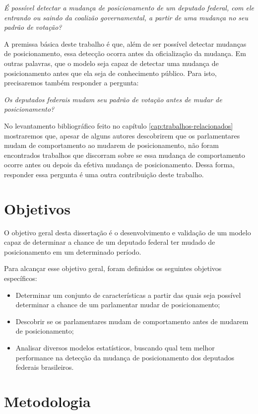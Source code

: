 \emph{É possível detectar a mudança de posicionamento de um deputado federal,
com ele entrando ou saindo da coalizão governamental, a partir de uma mudança
no seu padrão de votação?}

A premissa básica deste trabalho é que, além de ser possível detectar mudanças
de posicionamento, essa detecção ocorra antes da oficialização da mudança. Em
outras palavras, que o modelo seja capaz de detectar uma mudança de
posicionamento antes que ela seja de conhecimento público. Para isto,
precisaremos também responder a pergunta:

\emph{Os deputados federais mudam seu padrão de votação antes de mudar de
posicionamento?}

No levantamento bibliográfico feito no capítulo
\ref{cap:trabalhos-relacionados} mostraremos que, apesar de alguns autores
descobrirem que os parlamentares mudam de comportamento ao mudarem de
posicionamento, não foram encontrados trabalhos que discorram sobre se essa
mudança de comportamento ocorre antes ou depois da efetiva mudança de
posicionamento. Dessa forma, responder essa pergunta é uma outra contribuição
deste trabalho.

\section{Objetivos}

O objetivo geral desta dissertação é o desenvolvimento e validação de um modelo
capaz de determinar a chance de um deputado federal ter mudado de
posicionamento em um determinado período.

Para alcançar esse objetivo geral, foram definidos os seguintes objetivos
específicos:

\begin{itemize}
  \item Determinar um conjunto de características a partir das quais seja
    possível determinar a chance de um parlamentar mudar de posicionamento;
  \item Descobrir se os parlamentares mudam de comportamento antes de mudarem
    de posicionamento;
  \item Analisar diversos modelos estatísticos, buscando qual tem melhor
    performance na detecção da mudança de posicionamento dos deputados
    federais brasileiros.
\end{itemize}

\section{Metodologia}

